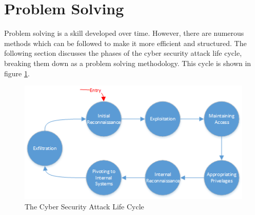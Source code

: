 	\section{Problem Solving}
		Problem solving is a skill developed over time. 
		However, there are numerous methods which can be followed to make it more efficient and structured. 
		The following section discusses the phases of the cyber security attack life cycle, breaking them down as a problem solving methodology\cite{APTMin,AttackLifeCycleAPTOverview}. 
		This cycle is shown in figure \ref{fig:CyberAttackLifeCycle}.
		\begin{figure}
			\centering
			\includegraphics[scale=0.8]{./AttackLifeCycle.png}
			\caption{The Cyber Security Attack Life Cycle}
			\label{fig:CyberAttackLifeCycle}
		\end{figure}

